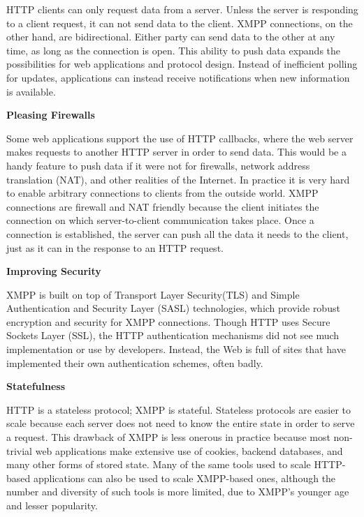      HTTP clients can only request data from a server. Unless the server is responding to a client request,
      it can not send data to the client. XMPP connections, on the other hand, are bidirectional. Either party
      can send data to the other at any time, as long as the connection is open. This ability to push data expands the possibilities for web applications and protocol design. Instead of inefficient polling for updates, applications can instead receive notifications when new information is available.

      \textbf{Pleasing Firewalls}

      Some web applications support the use of HTTP callbacks, where the web server makes requests to another HTTP server in order to send data. This would be a handy feature to push data if it were not for firewalls, network address translation (NAT), and other realities of the Internet. In practice it is very hard to enable arbitrary connections to clients from the outside world. XMPP connections are firewall and NAT friendly because the client initiates the connection on which server-to-client communication takes place. Once a connection is established, the server can push all the data it needs to the client, just as it can in the response to an HTTP request.
      
      \textbf{Improving Security}

      XMPP is built on top of Transport Layer Security(TLS) and Simple Authentication and Security Layer (SASL) technologies, which provide robust encryption and security for XMPP connections. Though HTTP uses Secure Sockets Layer (SSL), the HTTP authentication mechanisms did not see much implementation or use by developers. Instead, the Web is full of sites that have implemented their own authentication schemes, often badly.
      
      \textbf{Statefulness}

      HTTP is a stateless protocol; XMPP is stateful. Stateless protocols are easier to scale because each server does not need to know the entire state in order to serve a request. This drawback of XMPP is less onerous in practice because most non-trivial web applications make extensive use of cookies, backend databases, and many other forms of stored state. Many of the same tools used to scale HTTP-based applications can also be used to scale XMPP-based ones, although the number and diversity of such tools is more limited, due to XMPP’s younger age and lesser popularity.

